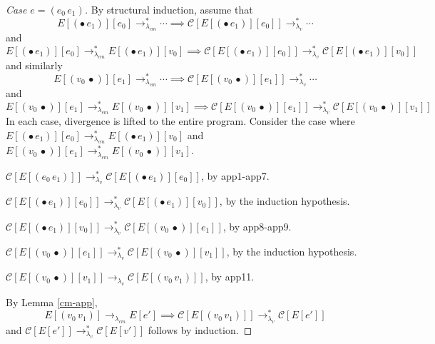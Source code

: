\documentclass[ms,electronic,twosidetoc,letterpaper,chaptercenter,parttop]{byumsphd}
\newcommand{\lvrr}{\rightarrow_{\lambda_v}}
\newcommand{\lvrrs}{\rightarrow_{\lambda_v}^{*}}
\newcommand{\cmrr}{\rightarrow_{\lambda_{cm}}}
\newcommand{\cmrrs}{\rightarrow_{\lambda_{cm}}^{*}}
\newcommand{\C}[1]{\mathcal{C}[#1]}
\newcommand{\app}[2]{(#1\,#2)}
\newcommand{\hole}{\bullet}
\begin{document}
\begin{proof}[Case $e=\app{e_0}{e_1}$]
By structural induction, assume that 
\[
E[\app{\hole}{e_1}][e_0]\cmrrs\cdots\implies\C{E[\app{\hole}{e_1}][e_0]}\lvrrs\cdots
\]
and
\[
E[\app{\hole}{e_1}][e_0]\cmrrs E[\app{\hole}{e_1}][v_0]\implies\C{E[\app{\hole}{e_1}][e_0]}\lvrrs\C{E[\app{\hole}{e_1}][v_0]}
\]
and similarly
\[
E[\app{v_0}{\hole}][e_1]\cmrrs\cdots\implies\C{E[\app{v_0}{\hole}][e_1]}\lvrrs\cdots
\]
and
\[
E[\app{v_0}{\hole}][e_1]\cmrrs E[\app{v_0}{\hole}][v_1]\implies\C{E[\app{v_0}{\hole}][e_1]}\lvrrs\C{E[\app{v_0}{\hole}][v_1]}
\]
In each case, divergence is lifted to the entire program. Consider the case where $E[\app{\hole}{e_1}][e_0]\cmrrs E[\app{\hole}{e_1}][v_0]$ and $E[\app{v_0}{\hole}][e_1]\cmrrs E[\app{v_0}{\hole}][v_1]$.

$\C{E[\app{e_0}{e_1}]}\lvrrs\C{E[\app{\hole}{e_1}][e_0]}$, by app1-app7.

$\C{E[\app{\hole}{e_1}][e_0]}\lvrrs\C{E[\app{\hole}{e_1}][v_0]}$, by the induction hypothesis.

$\C{E[\app{\hole}{e_1}][v_0]}\lvrrs\C{E[\app{v_0}{\hole}][e_1]}$, by app8-app9.

$\C{E[\app{v_0}{\hole}][e_1]}\lvrrs\C{E[\app{v_0}{\hole}][v_1]}$, by the induction hypothesis.

$\C{E[\app{v_0}{\hole}][v_1]}\lvrr\C{E[\app{v_0}{v_1}]}$, by app11.

By Lemma \ref{cm-app},
\[
E[\app{v_0}{v_1}]\cmrr E[e']\implies\C{E[\app{v_0}{v_1}]}\lvrrs\C{E[e']}
\]
and $\C{E[e']}\lvrrs\C{E[v']}$ follows by induction.
\end{proof}
\end{document}
